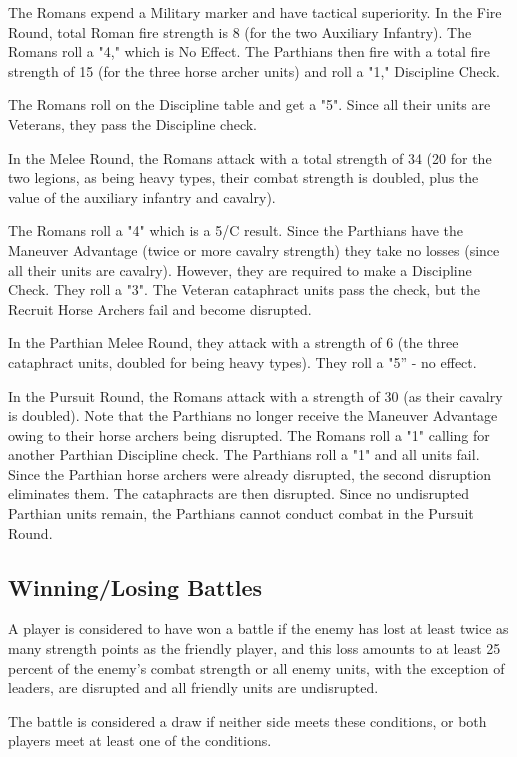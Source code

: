 The Romans expend a Military marker and have tactical superiority. In the Fire Round, total Roman fire strength is 8 (for the two Auxiliary Infantry). The Romans roll a "4," which is No Effect. The Parthians then fire with a total fire strength of 15 (for the three horse archer units) and roll a "1," Discipline Check.

The Romans roll on the Discipline table and get a "5". Since all their units are Veterans, they pass the Discipline check.

In the Melee Round, the Romans attack with a total strength of 34 (20 for the two legions, as being heavy types, their combat strength is doubled, plus the value of the auxiliary infantry and cavalry).

The Romans roll a "4" which is a 5/C result. Since the Parthians have the Maneuver Advantage (twice or more cavalry strength) they take no losses (since all their units are cavalry). However, they are required to make a Discipline Check. They roll a "3". The Veteran cataphract units pass the check, but the Recruit Horse Archers fail and become disrupted.

In the Parthian Melee Round, they attack with a strength of 6 (the three cataphract units, doubled for being heavy types). They roll a "5” - no effect.

In the Pursuit Round, the Romans attack with a strength of 30 (as their cavalry is doubled). Note that the Parthians no longer receive the Maneuver Advantage owing to their horse archers being disrupted. The Romans roll a "1" calling for another Parthian Discipline check. The Parthians roll a "1" and all units fail. Since the Parthian horse archers were already disrupted, the second disruption eliminates them. The cataphracts are then disrupted. Since no undisrupted Parthian units remain, the Parthians cannot conduct combat in the Pursuit Round.

\subsection{Winning/Losing Battles}

A player is considered to have won a battle if the enemy has lost at least twice as many strength points as the friendly player, and this loss amounts to at least 25 percent of the enemy's combat strength or all enemy units, with the exception of leaders, are disrupted and all friendly units are undisrupted.

The battle is considered a draw if neither side meets these conditions, or both players meet at least one of the conditions.

